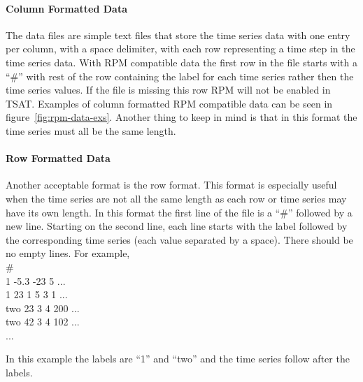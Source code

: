 \documentclass[titlepage, letterpaper, 12pt]{article}
\newenvironment{allintypewriter}{\ttfamily}{\par}
\begin{document}
\paragraph{Column Formatted Data}
The data files are simple text files that store the time series data with one entry per column, with a space delimiter, with each row representing a time step in the time series data. With RPM compatible data the first row in the file starts with a ``\#'' with rest of the row containing the label for each time series rather then the time series values. If the file is missing this row RPM will not be enabled in TSAT. Examples of column formatted RPM compatible data can be seen in figure~\ref{fig:rpm-data-exs}.  Another thing to keep in mind is that in this format the time series must all be the same length. 

\paragraph{Row Formatted Data}
Another acceptable format is the row format.  This format is especially useful  when the time series are not all the same length as each row or time series may have its own length.  In this format the first line of the file is a ``\#'' followed by a new line.  Starting on the second line, each line starts with the label followed by the corresponding time series (each value separated by a space).  There should be no empty lines.  For example,\\
\begin{allintypewriter}
	\noindent\#\\
	1 -5.3 -23 5 ...\\
	1 23 1 5 3 1 ...\\
	two 23 3 4 200 ...\\
	two 42 3 4 102 ...\\
	...
\end{allintypewriter}
In this example the labels are ``1'' and ``two'' and the time series follow after the labels.
\end{document}
